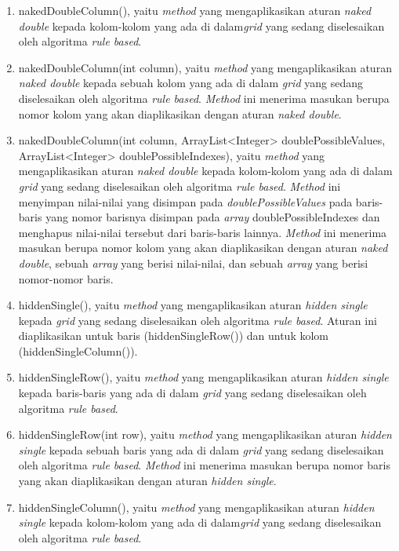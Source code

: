\begin{enumerate}
\item nakedDoubleColumn(), yaitu \textit{method} yang mengaplikasikan aturan \textit{naked double} kepada kolom-kolom yang ada di dalam\textit{grid} yang sedang diselesaikan oleh algoritma \textit{rule based}.
\item nakedDoubleColumn(int column), yaitu \textit{method} yang mengaplikasikan aturan \textit{naked double} kepada sebuah kolom yang ada di dalam \textit{grid} yang sedang diselesaikan oleh algoritma \textit{rule based}. \textit{Method} ini menerima masukan berupa nomor kolom yang akan diaplikasikan dengan aturan \textit{naked double}.
\item nakedDoubleColumn(int column, ArrayList<Integer> doublePossibleValues, ArrayList<Integer> doublePossibleIndexes), yaitu \textit{method} yang mengaplikasikan aturan \textit{naked double} kepada kolom-kolom yang ada di dalam \textit{grid} yang sedang diselesaikan oleh algoritma \textit{rule based}. \textit{Method} ini menyimpan nilai-nilai yang disimpan pada \textit{doublePossibleValues} pada baris-baris yang nomor barisnya disimpan pada \textit{array} doublePossibleIndexes dan menghapus nilai-nilai tersebut dari baris-baris lainnya. \textit{Method} ini menerima masukan berupa nomor kolom yang akan diaplikasikan dengan aturan \textit{naked double}, sebuah \textit{array} yang berisi nilai-nilai, dan sebuah \textit{array} yang berisi nomor-nomor baris.
\item hiddenSingle(), yaitu \textit{method} yang mengaplikasikan aturan \textit{hidden single} kepada \textit{grid} yang sedang diselesaikan oleh algoritma \textit{rule based}. Aturan ini diaplikasikan untuk baris (hiddenSingleRow()) dan untuk kolom (hiddenSingleColumn()).
\item hiddenSingleRow(), yaitu \textit{method} yang mengaplikasikan aturan \textit{hidden single} kepada baris-baris yang ada di dalam \textit{grid} yang sedang diselesaikan oleh algoritma \textit{rule based}.
\item hiddenSingleRow(int row), yaitu \textit{method} yang mengaplikasikan aturan \textit{hidden single} kepada sebuah baris yang ada di dalam \textit{grid} yang sedang diselesaikan oleh algoritma \textit{rule based}. \textit{Method} ini menerima masukan berupa nomor baris yang akan diaplikasikan dengan aturan \textit{hidden single}.
\item hiddenSingleColumn(), yaitu \textit{method} yang mengaplikasikan aturan \textit{hidden single} kepada kolom-kolom yang ada di dalam\textit{grid} yang sedang diselesaikan oleh algoritma \textit{rule based}.

\end{enumerate}

